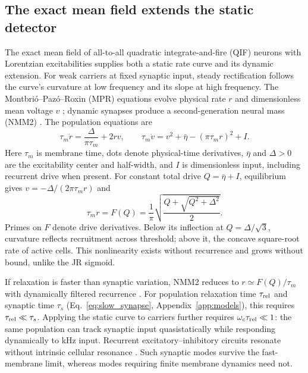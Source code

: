 \subsection{The exact mean field extends the static detector}\label{sec:dynamic}
The exact mean field of all-to-all quadratic integrate-and-fire (QIF) neurons
with Lorentzian excitabilities supplies both a static rate curve and its
dynamic extension. For weak carriers at fixed synaptic input, steady
rectification follows the curve's curvature at low frequency and its slope
at high frequency. The Montbri\'o--Paz\'o--Roxin (MPR) equations evolve physical
rate $r$ and dimensionless mean voltage $v$ \cite{montbrio2015}; dynamic
synapses produce a second-generation neural mass (NMM2)
\cite{ruffini2021nmm2,clusella2023}. The population equations are
\begin{equation}
\tau_m\dot r=\frac{\Delta}{\pi\tau_m}+2rv,\qquad
\tau_m\dot v=v^2+\bar\eta-(\pi\tau_m r)^2+I.
\label{eq:mpr}
\end{equation}
Here $\tau_m$ is membrane time, dots denote physical-time derivatives,
$\bar\eta$ and $\Delta>0$ are the excitability center and half-width, and
$I$ is dimensionless input, including recurrent drive when present.
For constant total drive $Q=\bar\eta+I$, equilibrium gives
$v=-\Delta/(2\pi\tau_m r)$ and
\begin{equation}
\tau_m r=F(Q)=\frac{1}{\pi}\sqrt{\frac{Q+\sqrt{Q^2+\Delta^2}}{2}} .
\label{eq:Fmpr}
\end{equation}
Primes on $F$ denote drive derivatives. Below its inflection at
$Q=\Delta/\sqrt3$, curvature reflects recruitment across threshold;
above it, the concave square-root rate of active cells. This nonlinearity
exists without recurrence and grows without bound, unlike the JR sigmoid.

If relaxation is faster than synaptic variation, NMM2 reduces to
$r\simeq F(Q)/\tau_m$ with dynamically filtered recurrence
\cite{ruffini2021nmm2,clusella2023}. For population relaxation time
$\tau_{\rm rel}$ and synaptic time $\tau_s$ (Eq.~\eqref{eq:slow_synapse},
Appendix~\ref{app:models}), this requires $\tau_{\rm rel}\ll\tau_s$.
Applying the static curve to carriers further requires
$\omega_c\tau_{\rm rel}\ll1$: the same population can track synaptic
input quasistatically while responding dynamically to kHz input.
Recurrent excitatory--inhibitory circuits resonate without intrinsic
cellular resonance \cite{brunelhakim1999,brunelwang2003}. Such synaptic
modes survive the fast-membrane limit, whereas modes requiring finite
membrane dynamics need not.

